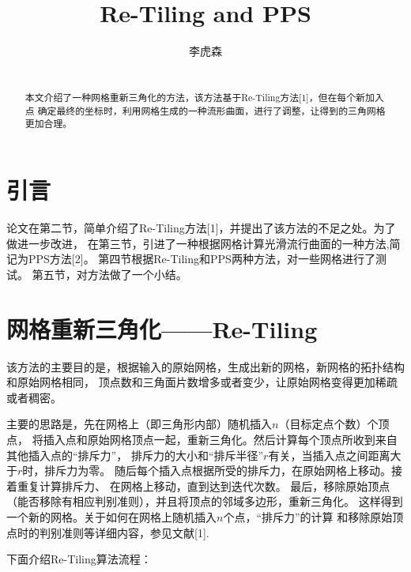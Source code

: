 \documentclass[lang=cn,11pt,a4paper,cite=authoryear]{elegantpaper}
\title{Re-Tiling and PPS}
\author{李虎森}
\date{}
\begin{document}
\maketitle

\begin{abstract}
\\

本文介绍了一种网格重新三角化的方法，该方法基于Re-Tiling方法[1]，但在每个新加入点
确定最终的坐标时，利用网格生成的一种流形曲面，进行了调整，让得到的三角网格更加合理。


\end{abstract}


\section{引言}

论文在第二节，简单介绍了Re-Tiling方法[1]，并提出了该方法的不足之处。为了做进一步改进，
在第三节，引进了一种根据网格计算光滑流行曲面的一种方法,简记为PPS方法[2]。
第四节根据Re-Tiling和PPS两种方法，对一些网格进行了测试。
第五节，对方法做了一个小结。

\section{网格重新三角化——Re-Tiling}

该方法的主要目的是，根据输入的原始网格，生成出新的网格，新网格的拓扑结构和原始网格相同，
顶点数和三角面片数增多或者变少，让原始网格变得更加稀疏或者稠密。

主要的思路是，先在网格上（即三角形内部）随机插入$n$（目标定点个数）个顶点，
将插入点和原始网格顶点一起，重新三角化。然后计算每个顶点所收到来自其他插入点的“排斥力”，
排斥力的大小和“排斥半径”$r$有关，当插入点之间距离大于$r$时，排斥力为零。
随后每个插入点根据所受的排斥力，在原始网格上移动。接着重复计算排斥力、
在网格上移动，直到达到迭代次数。
最后，移除原始顶点（能否移除有相应判别准则），并且将顶点的邻域多边形，重新三角化。
这样得到一个新的网格。关于如何在网格上随机插入$n$个点，“排斥力”的计算
和移除原始顶点时的判别准则等详细内容，参见文献[1].

下面介绍Re-Tiling算法流程：\\
\end{document}
